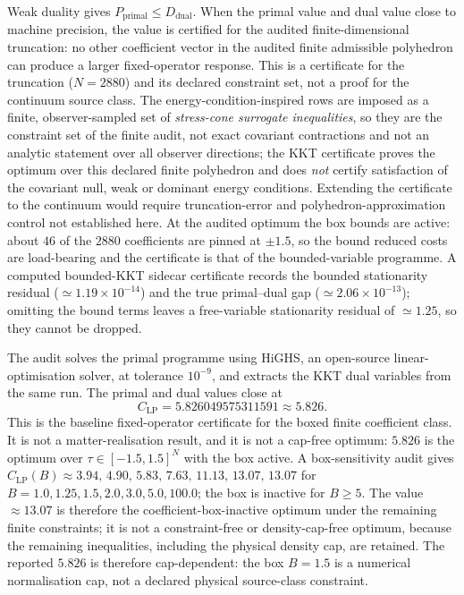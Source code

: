\documentclass[11pt,a4paper]{article}
\begin{document}
Weak duality gives $P_{\mathrm{primal}}\leq D_{\mathrm{dual}}$. When the primal value and dual value close to machine precision, the value is certified for the audited finite-dimensional truncation: no other coefficient vector in the audited finite admissible polyhedron can produce a larger fixed-operator response. This is a certificate for the truncation ($N=2880$) and its declared constraint set, not a proof for the continuum source class. The energy-condition-inspired rows are imposed as a finite, observer-sampled set of \emph{stress-cone surrogate inequalities}, so they are the constraint set of the finite audit, not exact covariant contractions and not an analytic statement over all observer directions; the KKT certificate proves the optimum over this declared finite polyhedron and does \emph{not} certify satisfaction of the covariant null, weak or dominant energy conditions. Extending the certificate to the continuum would require truncation-error and polyhedron-approximation control not established here. At the audited optimum the box bounds are active: about $46$ of the $2880$ coefficients are pinned at $\pm1.5$, so the bound reduced costs are load-bearing and the certificate is that of the bounded-variable programme. A computed bounded-KKT sidecar certificate records the bounded stationarity residual ($\simeq1.19\times10^{-14}$) and the true primal--dual gap ($\simeq2.06\times10^{-13}$); omitting the bound terms leaves a free-variable stationarity residual of $\simeq1.25$, so they cannot be dropped.

The audit solves the primal programme using HiGHS, an open-source linear-optimisation solver, at tolerance $10^{-9}$, and extracts the KKT dual variables from the same run. The primal and dual values close at
\[
C_{\mathrm{LP}} = 5.826049575311591 \approx 5.826.
\]
This is the baseline fixed-operator certificate for the boxed finite coefficient class. It is not a matter-realisation result, and it is not a cap-free optimum: $5.826$ is the optimum over $\tau\in[-1.5,1.5]^{N}$ with the box active. A box-sensitivity audit gives $C_{\mathrm{LP}}(B)\approx 3.94,\,4.90,\,5.83,\,7.63,\,11.13,\,13.07,\,13.07$ for $B=1.0,1.25,1.5,2.0,3.0,5.0,100.0$; the box is inactive for $B\geq5$. The value $\approx13.07$ is therefore the coefficient-box-inactive optimum under the remaining finite constraints; it is not a constraint-free or density-cap-free optimum, because the remaining inequalities, including the physical density cap, are retained. The reported $5.826$ is therefore cap-dependent: the box $B=1.5$ is a numerical normalisation cap, not a declared physical source-class constraint.
\end{document}
